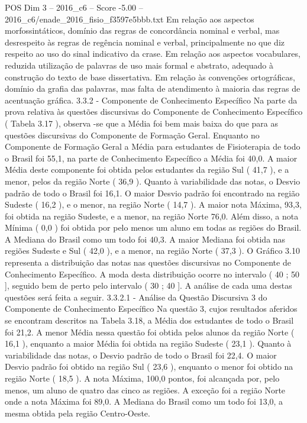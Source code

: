 \begin{textsample}{POS Dim 3 – 2016\_c6 – Score -5.00 – 2016\_c6/enade\_2016\_fisio\_f3597e5bbb.txt}
Em relação aos aspectos morfossintáticos, domínio das regras de concordância nominal e verbal, mas desrespeito às regras de regência nominal e verbal, principalmente no que diz respeito ao uso do sinal indicativo da crase.
Em relação aos aspectos vocabulares, reduzida utilização de palavras de uso mais formal e abstrato, adequado à construção do texto de base dissertativa.
Em relação às convenções ortográficas, domínio da grafia das palavras, mas falta de atendimento à maioria das regras de acentuação gráfica. 3.3.2 - Componente de Conhecimento Específico Na parte da prova relativa às questões discursivas do Componente de Conhecimento Específico ( Tabela 3.17 ), observa -se que a Média foi bem mais baixa do que para as questões discursivas do Componente de Formação Geral.
Enquanto no Componente de Formação Geral a Média para estudantes de Fisioterapia de todo o Brasil foi 55,1, na parte de Conhecimento Específico a Média foi 40,0.
A maior Média deste componente foi obtida pelos estudantes da região Sul ( 41,7 ), e a menor, pelos da região Norte ( 36,9 ).
Quanto à variabilidade das notas, o Desvio padrão de todo o Brasil foi 16,1.
O maior Desvio padrão foi encontrado na região Sudeste ( 16,2 ), e o menor, na região Norte ( 14,7 ).
A maior nota Máxima, 93,3, foi obtida na região Sudeste, e a menor, na região Norte 76,0.
Além disso, a nota Mínima ( 0,0 ) foi obtida por pelo menos um aluno em todas as regiões do Brasil.
A Mediana do Brasil como um todo foi 40,3.
A maior Mediana foi obtida nas regiões Sudeste e Sul ( 42,0 ), e a menor, na região Norte ( 37,3 ).
O Gráfico 3.10 representa a distribuição das notas nas questões discursivas no Componente de Conhecimento Específico.
A moda desta distribuição ocorre no intervalo ( 40 ; 50 ], seguido bem de perto pelo intervalo ( 30 ; 40 ].
A análise de cada uma destas questões será feita a seguir. 3.3.2.1 - Análise da Questão Discursiva 3 do Componente de Conhecimento Específico Na questão 3, cujos resultados aferidos se encontram descritos na Tabela 3.18, a Média dos estudantes de todo o Brasil foi 21,2.
A menor Média nessa questão foi obtida pelos alunos da região Norte ( 16,1 ), enquanto a maior Média foi obtida na região Sudeste ( 23,1 ).
Quanto à variabilidade das notas, o Desvio padrão de todo o Brasil foi 22,4.
O maior Desvio padrão foi obtido na região Sul ( 23,6 ), enquanto o menor foi obtido na região Norte ( 18,5 ).
A nota Máxima, 100,0 pontos, foi alcançada por, pelo menos, um aluno de quatro das cinco as regiões.
A exceção foi a região Norte onde a nota Máxima foi 89,0.
A Mediana do Brasil como um todo foi 13,0, a mesma obtida pela região Centro-Oeste.

\end{textsample}

